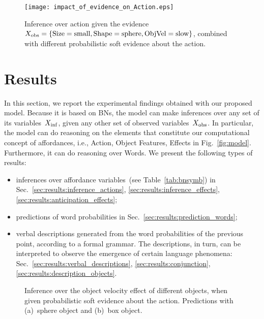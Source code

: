 
\begin{figure}
\centering
\texttt{[image: impact\_of\_evidence\_on\_Action.eps]}
\caption{Inference over action given the evidence $X_\text{obs} =\{\text{Size}=\text{small}, \text{Shape}=\text{sphere}, \text{ObjVel}=\text{slow}\}$, combined with different probabilistic soft evidence about the action.}
\label{fig:impact_of_evidence_on_Action}
\end{figure}

\section{Results}
\label{sec:results}

In this section, we report the experimental findings obtained with our proposed model.
Because it is based on \aclp{BN}, the model can make inferences over any set of its variables~$X_\text{inf}$, given any other set of observed variables~$X_\text{obs}$.
In particular, the model can do reasoning on the elements that constitute our computational concept of affordances, i.e., Action, Object Features, Effects in Fig.~\ref{fig:model}.
Furthermore, it can do reasoning over Words.
We present the following types of results:
\begin{itemize}
  \item inferences over affordance variables~(see Table~\ref{tab:bnsymb}) in Sec.~\ref{sec:results:inference_actions}, \ref{sec:results:inference_effects}, \ref{sec:results:anticipation_effects};

  \item predictions of word probabilities in Sec.~\ref{sec:results:prediction_words};

  \item verbal descriptions generated from the word probabilities of the previous point, according to a formal grammar. The descriptions, in turn, can be interpreted to observe the emergence of certain language phenomena: Sec.~\ref{sec:results:verbal_descriptions}, \ref{sec:results:conjunction}, \ref{sec:results:description_objects}.
\end{itemize}

\begin{figure*}
\centering
{} \quad
%
\caption{Inference over the object velocity effect of different objects, when given probabilistic soft evidence about the action.
Predictions with (a)~sphere object and (b)~box object.}
\label{fig:impact_of_evidence_on_ObjVel}
\end{figure*}

